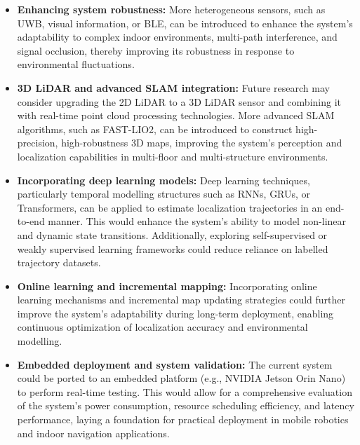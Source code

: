 \documentclass[12pt,a4paper]{article}
\numberwithin{equation}{section}
\begin{document}
\begin{itemize}
\item \textbf{Enhancing system robustness:} More heterogeneous sensors, such as
  UWB, visual information, or BLE, can be introduced to enhance the system's
  adaptability to complex indoor environments, multi-path interference, and
  signal occlusion, thereby improving its robustness in response to
  environmental fluctuations.
    
\item \textbf{3D LiDAR and advanced SLAM integration:} Future research may
  consider upgrading the 2D LiDAR to a 3D LiDAR sensor and combining it with
  real-time point cloud processing technologies. More advanced SLAM algorithms,
  such as FAST-LIO2, can be introduced to construct high-precision,
  high-robustness 3D maps, improving the system's perception and localization
  capabilities in multi-floor and multi-structure environments.
    
\item \textbf{Incorporating deep learning models:} Deep learning techniques,
  particularly temporal modelling structures such as RNNs, GRUs, or
  Transformers, can be applied to estimate localization trajectories in an
  end-to-end manner. This would enhance the system's ability to model non-linear
  and dynamic state transitions. Additionally, exploring self-supervised or
  weakly supervised learning frameworks could reduce reliance on labelled
  trajectory datasets.
    
\item \textbf{Online learning and incremental mapping:} Incorporating online
  learning mechanisms and incremental map updating strategies could further
  improve the system's adaptability during long-term deployment, enabling
  continuous optimization of localization accuracy and environmental modelling.
    
\item \textbf{Embedded deployment and system validation:} The current system
  could be ported to an embedded platform (e.g., NVIDIA Jetson Orin Nano) to
  perform real-time testing. This would allow for a comprehensive evaluation of
  the system's power consumption, resource scheduling efficiency, and latency
  performance, laying a foundation for practical deployment in mobile robotics
  and indoor navigation applications.
\end{itemize}




\end{document}
